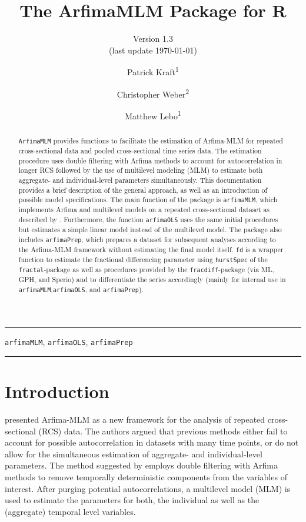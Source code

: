 \documentclass[12pt]{paper}\usepackage[]{graphicx}\usepackage[]{color}
\author{Patrick Kraft\textsuperscript{1} \and
Christopher Weber\textsuperscript{2} \and
Matthew Lebo\textsuperscript{1}}
\title{The ArfimaMLM Package for R}
\subtitle{Version 1.3\\\footnotesize{(last update \today)}}
\begin{document}
\pagestyle{fancy}

\fancyfoot[C]{\thepage} %

\maketitle

\hrule
\begin{abstract}
\texttt{ArfimaMLM} provides functions to facilitate the estimation of Arfima-MLM for repeated cross-sectional data and pooled cross-sectional time series data. The estimation procedure uses double filtering with Arfima methods to account for autocorrelation in longer RCS followed by the use of multilevel modeling (MLM) to estimate both aggregate- and individual-level parameters simultaneously. This documentation provides a brief description of the general approach, as well as an  introduction of possible model specifications. The main function of the package is \texttt{arfimaMLM}, which implements Arfima and multilevel models on a repeated cross-sectional dataset as described by \citet{lebo2015effective}. Furthermore, the function \texttt{arfimaOLS} uses the same initial procedures but estimates a simple linear model instead of the multilevel model. The package also includes \texttt{arfimaPrep}, which prepares a dataset for subsequent analyses according to the Arfima-MLM framework without estimating the final model itself. \texttt{fd} is a wrapper function to estimate the fractional differencing parameter using \texttt{hurstSpec} of the \texttt{fractal}-package as well as procedures provided by the \texttt{fracdiff}-package (via ML, GPH, and Sperio) and to differentiate the series accordingly (mainly for internal use in \texttt{arfimaMLM},\texttt{arfimaOLS}, and \texttt{arfimaPrep}).
\end{abstract}

\begin{keywords}
\texttt{arfimaMLM}, \texttt{arfimaOLS}, \texttt{arfimaPrep}
\end{keywords}
\hrule

\vfill
\newpage


\section{Introduction}

\citet{lebo2015effective} presented Arfima-MLM as a new framework for the analysis of repeated cross-sectional (RCS) data. The authors argued that previous methods either fail to account for possible autocorrelation in datasets with many time points, or do not allow for the simultaneous estimation of aggregate- and individual-level parameters. The method suggested by \citet{lebo2015effective} employs double filtering with Arfima methods to remove temporally deterministic components from the variables of interest. After purging potential autocorrelations, a multilevel model (MLM) is used to estimate the parameters for both, the individual as well as the (aggregate) temporal level variables.
\end{document}
